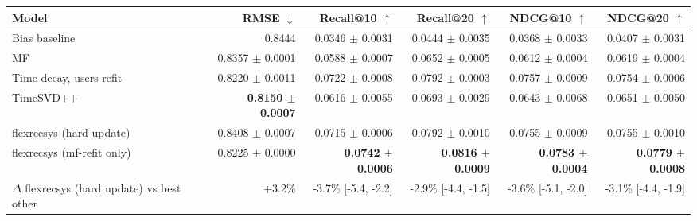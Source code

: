 \begin{tabular}{lrrrrr}
\toprule
Model & RMSE $\downarrow$ & Recall@10 $\uparrow$ & Recall@20 $\uparrow$ & NDCG@10 $\uparrow$ & NDCG@20 $\uparrow$ \\
\midrule
Bias baseline & 0.8444 & 0.0346 $\pm$ 0.0031 & 0.0444 $\pm$ 0.0035 & 0.0368 $\pm$ 0.0033 & 0.0407 $\pm$ 0.0031 \\
MF & 0.8357 $\pm$ 0.0001 & 0.0588 $\pm$ 0.0007 & 0.0652 $\pm$ 0.0005 & 0.0612 $\pm$ 0.0004 & 0.0619 $\pm$ 0.0004 \\
Time decay, users refit & 0.8220 $\pm$ 0.0011 & 0.0722 $\pm$ 0.0008 & 0.0792 $\pm$ 0.0003 & 0.0757 $\pm$ 0.0009 & 0.0754 $\pm$ 0.0006 \\
TimeSVD++ & \textbf{0.8150 $\pm$ 0.0007} & 0.0616 $\pm$ 0.0055 & 0.0693 $\pm$ 0.0029 & 0.0643 $\pm$ 0.0068 & 0.0651 $\pm$ 0.0050 \\
flexrecsys (hard update) & 0.8408 $\pm$ 0.0007 & 0.0715 $\pm$ 0.0006 & 0.0792 $\pm$ 0.0010 & 0.0755 $\pm$ 0.0009 & 0.0755 $\pm$ 0.0010 \\
flexrecsys (mf-refit only) & 0.8225 $\pm$ 0.0000 & \textbf{0.0742 $\pm$ 0.0006} & \textbf{0.0816 $\pm$ 0.0009} & \textbf{0.0783 $\pm$ 0.0004} & \textbf{0.0779 $\pm$ 0.0008} \\
\midrule
$\Delta$ flexrecsys (hard update) vs best other & +3.2\% & -3.7\% [-5.4, -2.2] & -2.9\% [-4.4, -1.5] & -3.6\% [-5.1, -2.0] & -3.1\% [-4.4, -1.9] \\
\bottomrule
\end{tabular}
